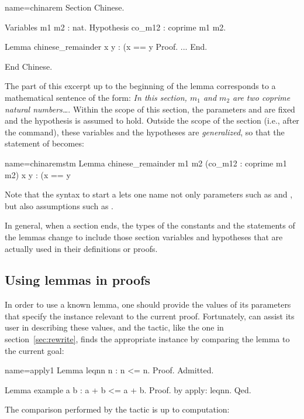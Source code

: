 \begin{coq}{name=chinarem}{}
Section Chinese.

Variables m1 m2 : nat.
Hypothesis co_m12 : coprime m1 m2.

Lemma chinese_remainder x y :
  (x == y %
Proof.
...
End.

End Chinese.
\end{coq}
The part of this excerpt up to the beginning of the lemma
corresponds to a mathematical sentence of the form: \emph{In this section,
  $m_1$ and $m_2$ are two coprime natural numbers\dots}. Within the
scope of this section, the parameters  and  are
fixed and the hypothesis  is assumed to hold.
Outside the scope of the section (i.e., after the
 command), these variables and the hypotheses are
\emph{generalized}, so that the statement of 
becomes:

\begin{coq}{name=chinaremstm}{}
Lemma chinese_remainder m1 m2 (co_m12 : coprime m1 m2) x y :
  (x == y %
\end{coq}
Note that the syntax to start a  lets one name not only
parameters such as  and ,
but also assumptions such as .

In general, when a section ends, the types of the constants and the
statements of the lemmas change to include those section variables
and hypotheses that are actually used in their definitions or proofs.


\subsection{Using lemmas in proofs}
\label{sec:quantifiedst}

In order to use a known lemma, one should provide the values of its
parameters that specify the instance relevant to the current
proof. Fortunately, \Coq{} can assist its user in
describing these values, and the  tactic, like the
 one in section~\ref{sec:rewrite}, finds the appropriate
instance by comparing the lemma to the current goal:

\begin{coq}{name=apply1}{}
Lemma leqnn n : n <= n. Proof. Admitted.

Lemma example a b : a + b <= a + b.
Proof. by apply: leqnn. Qed.
\end{coq}
The comparison performed by the  tactic is up to computation:

